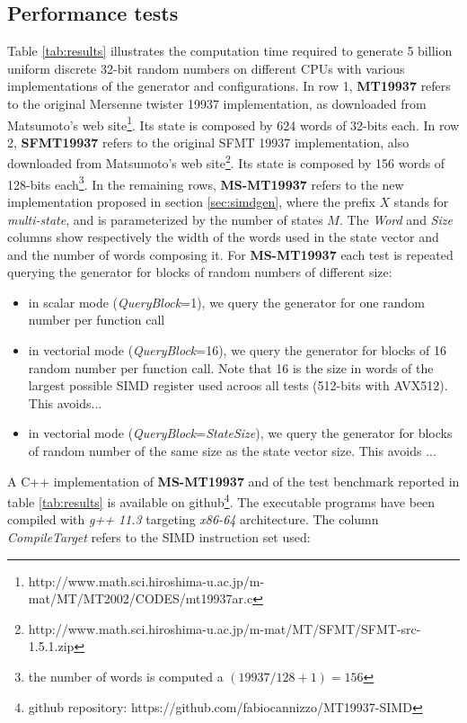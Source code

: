 \documentclass[preprint,1p,times]{elsarticle}
\begin{document}
\subsection{Performance tests}
\label{sec:tests}
\noindent Table \ref{tab:results} illustrates the computation time required to generate 5 billion uniform discrete 32-bit random numbers on different CPUs with various implementations of the generator and configurations.
In row 1, \textbf{MT19937} refers to the original Mersenne twister 19937 implementation, as downloaded from Matsumoto's web site\footnote{\label{fn:orig}http://www.math.sci.hiroshima-u.ac.jp/m-mat/MT/MT2002/CODES/mt19937ar.c}. Its state is composed by 624 words of 32-bits each.
In row 2, \textbf{SFMT19937} refers to the original SFMT 19937 implementation, also downloaded from Matsumoto's web site\footnote{http://www.math.sci.hiroshima-u.ac.jp/m-mat/MT/SFMT/SFMT-src-1.5.1.zip}. Its state is composed by 156 words of 128-bits each\footnote{the number of words is computed a $(19937 / 128 + 1)=156$}.
In the remaining rows, \textbf{MS-MT19937} refers to the new implementation proposed in section \ref{sec:simdgen}, where the prefix $X$ stands for \textit{multi-state}, and is parameterized by the number of states $M$.
The \textit{Word} and \textit{Size} columns show respectively the width of the words used in the state vector and and the number of words composing it.
For \textbf{MS-MT19937} each test is repeated querying the generator for blocks of random numbers of different size:
\begin{itemize}
    \item in scalar mode (\textit{QueryBlock}=1), we query the generator for one random number per function call
    \item in vectorial mode (\textit{QueryBlock}=16), we query the generator for blocks of 16 random number per function call. Note that 16 is the size in words of the largest possible SIMD register used acroos all tests (512-bits with AVX512). This avoids...
    \item in vectorial mode (\textit{QueryBlock}=\textit{StateSize}), we query the generator for blocks of random number of the same size as the state vector size. This avoids ...
\end{itemize}
A C++ implementation of \textbf{MS-MT19937} and of the test benchmark reported in table \ref{tab:results} is available on github\footnote{github repository: https://github.com/fabiocannizzo/MT19937-SIMD}. The executable programs have been compiled with \textit{g++ 11.3} targeting \textit{x86-64} architecture. The column \textit{CompileTarget} refers to the SIMD instruction set used:
\end{document}
